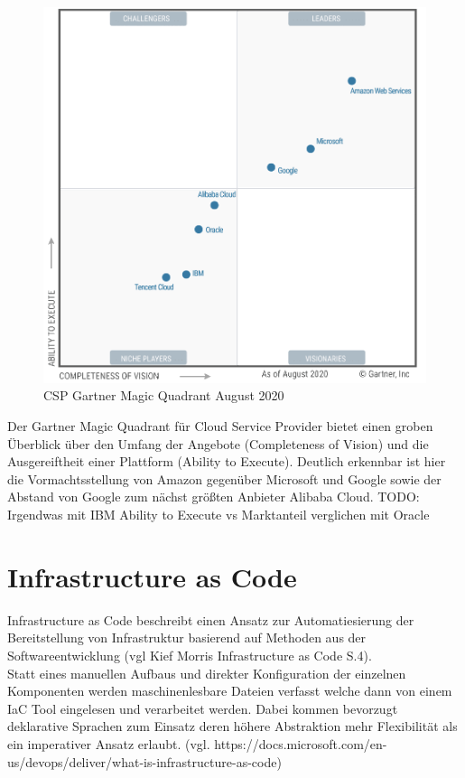 \begin{figure}[H]
  \includegraphics[width=1.0\textwidth]{fig/hauptteil/Gartner-Magic-Quadrant.png}
  \caption{CSP Gartner Magic Quadrant August 2020}
  \centering
\end{figure}

Der Gartner Magic Quadrant für Cloud Service Provider bietet einen groben
Überblick über den Umfang der Angebote (Completeness of Vision) und
die Ausgereiftheit einer Plattform (Ability to Execute). Deutlich erkennbar
ist hier die Vormachtsstellung von Amazon gegenüber Microsoft und Google sowie
der Abstand von Google zum nächst größten Anbieter Alibaba Cloud.
TODO: Irgendwas mit IBM Ability to Execute vs Marktanteil verglichen mit Oracle


\section{Infrastructure as Code}

Infrastructure as Code beschreibt einen Ansatz zur Automatiesierung der
Bereitstellung von Infrastruktur basierend auf Methoden aus der
Softwareentwicklung (vgl Kief Morris Infrastructure as Code S.4).\\
Statt eines manuellen Aufbaus und direkter Konfiguration der einzelnen
Komponenten werden maschinenlesbare Dateien verfasst welche dann von einem
IaC Tool eingelesen und verarbeitet werden. Dabei kommen bevorzugt
deklarative Sprachen zum Einsatz deren höhere Abstraktion mehr Flexibilität
als ein imperativer Ansatz erlaubt.
(vgl. https://docs.microsoft.com/en-us/devops/deliver/what-is-infrastructure-as-code)

